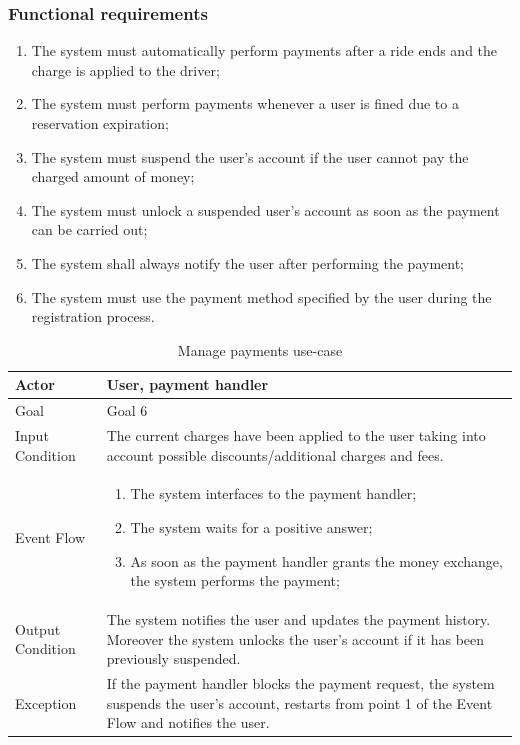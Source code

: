 \subsubsection{Functional requirements}
\begin{enumerate}
\item The system must automatically perform payments after a ride ends and the charge is applied to the driver;
\item The system must perform payments whenever a user is fined due to a reservation expiration;
\item The system must suspend the user's account if the user cannot pay the charged amount of money;
\item The system must unlock a suspended user's account as soon as the payment can be carried out;
\item The system shall always notify the user after performing the payment;
\item The system must use the payment method specified by the user during the registration process.
\end{enumerate}

\begin{table}[H]
\begin{center}
\begin{tabular}{p{} | p{}}
\hline
Actor & User, payment handler\\
\hline
Goal & Goal 6\\
\hline
Input Condition & The current charges have been applied to the user taking into account possible discounts/additional charges and fees.\\
\hline
Event Flow & 
\begin{enumerate}
\item The system interfaces to the payment handler;
\item The system waits for a positive answer;
\item As soon as the payment handler grants the money exchange, the system performs the payment;
\end{enumerate} \\
\hline
Output Condition & The system notifies the user and updates the payment history. Moreover the system unlocks the user's account if it has been previously suspended.\\
\hline
Exception & If the payment handler blocks the payment request, the system suspends the user's account, restarts from point 1 of the Event Flow and notifies the user.\\
\hline
\end{tabular}
\end{center}
\caption{Manage payments use-case}
\label{manage_payments_uc}
\end{table}

